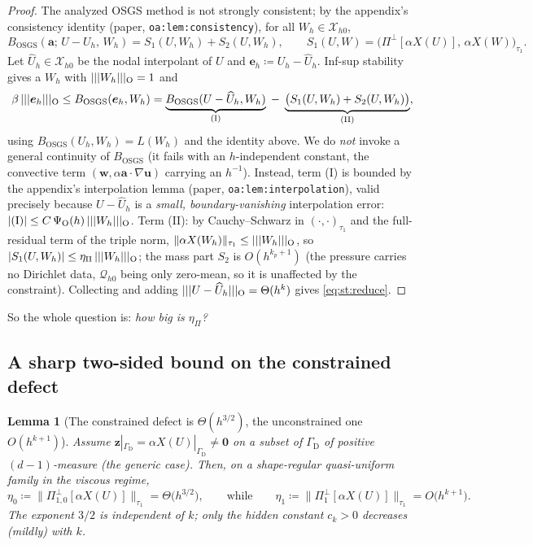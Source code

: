 \documentclass[11pt]{article}
\newcommand{\bu}{\boldsymbol{u}}
\newcommand{\bw}{\boldsymbol{w}}
\newcommand{\ba}{\boldsymbol{a}}
\newcommand{\bz}{\boldsymbol{z}}
\newcommand{\bzero}{\boldsymbol{0}}
\newcommand{\grad}{\nabla}
\newcommand{\Xhz}{\mathcal{X}_{h0}}
\newcommand{\Qhz}{\mathcal{Q}_{h0}}
\newcommand{\Ponez}{\Pi_{1,0}}
\newcommand{\Poneperp}{\Pi_{1}^{\perp}}
\newcommand{\normtau}[1]{\lVert #1 \rVert_{\tau_{1}}}
\DeclarePairedDelimiter\vvvert{\lvert\lvert\lvert}{\rvert\rvert\rvert}
\newcommand{\tnorm}[1]{\vvvert{#1}}
\theoremstyle{plain}
\newtheorem{lemma}{Lemma}
\theoremstyle{definition}
\theoremstyle{remark}
\begin{document}
\begin{proof}
The analyzed OSGS method is not strongly consistent; by the appendix's
consistency identity (paper, \texttt{oa:lem:consistency}), for all
$W_h\in\Xhz$,
\[
  B_{\mathrm{OSGS}}(\ba;\,U-U_h,\,W_h)=S_1(U,W_h)+S_2(U,W_h),
  \qquad S_1(U,W)=\bigl(\Pi^{\perp}[\alpha X(U)],\,\alpha X(W)\bigr)_{\tau_1}.
\]
Let $\widehat U_h\in\Xhz$ be the nodal interpolant of $U$ and
$\boldsymbol e_h\coloneqq U_h-\widehat U_h$. Inf-sup stability gives a
$W_h$ with $\tnorm{W_h}_{\mathrm{O}}=1$ and
\[
  \beta\,\tnorm{\boldsymbol e_h}_{\mathrm{O}}
  \le B_{\mathrm{OSGS}}(\boldsymbol e_h,W_h)
  = \underbrace{B_{\mathrm{OSGS}}(U-\widehat U_h,W_h)}_{(\mathrm I)}
  \;-\;\underbrace{\bigl(S_1(U,W_h)+S_2(U,W_h)\bigr)}_{(\mathrm{II})},
\]
using $B_{\mathrm{OSGS}}(U_h,W_h)=L(W_h)$ and the identity above. We do
\emph{not} invoke a general continuity of $B_{\mathrm{OSGS}}$ (it fails with
an $h$-independent constant, the convective term
$(\bw,\alpha\ba\cdot\grad\bu)$ carrying an $h^{-1}$). Instead, term (I) is
bounded by the appendix's interpolation lemma (paper,
\texttt{oa:lem:interpolation}), valid precisely because
$U-\widehat U_h$ is a \emph{small, boundary-vanishing} interpolation
error: $|(\mathrm I)|\le C\,\Psi_{\mathrm{O}}(h)\,\tnorm{W_h}_{\mathrm{O}}$.
Term (II): by Cauchy--Schwarz in $(\cdot,\cdot)_{\tau_1}$ and the full-residual
term of the triple norm, $\normtau{\alpha X(W_h)}\le\tnorm{W_h}_{\mathrm{O}}$,
so $|S_1(U,W_h)|\le\eta_\Pi\,\tnorm{W_h}_{\mathrm{O}}$; the mass part $S_2$ is
$O(h^{k_p+1})$ (the pressure carries no Dirichlet data, $\Qhz$ being only
zero-mean, so it is unaffected by the constraint). Collecting and adding
$\tnorm{U-\widehat U_h}_{\mathrm{O}}=\Theta(h^k)$ gives \cref{eq:st:reduce}.
\end{proof}

So the whole question is: \emph{how big is $\eta_\Pi$?}

\subsection{A sharp two-sided bound on the constrained defect}

\begin{lemma}[The constrained defect is $\Theta(h^{3/2})$, the unconstrained one $O(h^{k+1})$]
\label{lem:st:defect}
Assume $\bz|_{\Gamma_{\mathrm D}}=\alpha X(U)|_{\Gamma_{\mathrm D}}\neq\bzero$
on a subset of $\Gamma_{\mathrm D}$ of positive $(d\!-\!1)$-measure (the
generic case). Then, on a shape-regular quasi-uniform family in the
viscous regime,
\begin{equation}\label{eq:st:sharp}
  \eta_0\coloneqq\normtau{\Ponez^{\perp}[\alpha X(U)]}=\Theta\bigl(h^{3/2}\bigr),
  \qquad\text{while}\qquad
  \eta_1\coloneqq\normtau{\Poneperp[\alpha X(U)]}=O\bigl(h^{k+1}\bigr).
\end{equation}
The exponent $3/2$ is \emph{independent of $k$}; only the hidden constant
$c_k>0$ decreases (mildly) with $k$.
\end{lemma}
\end{document}
